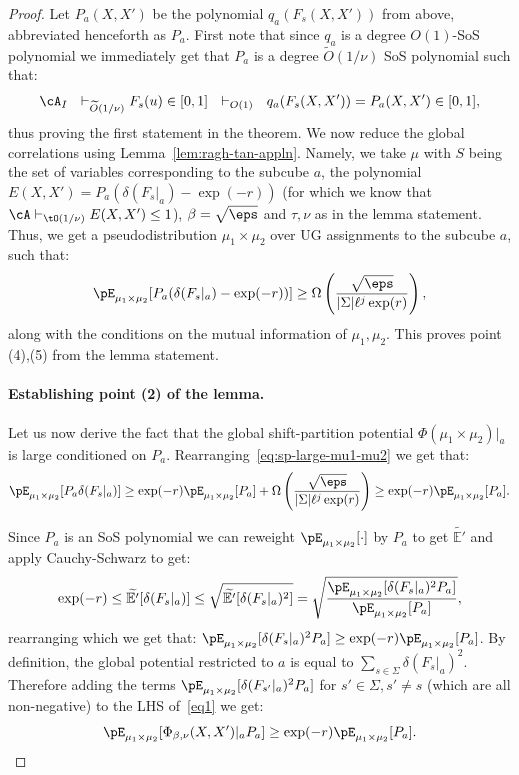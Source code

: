 \begin{proof}
Let $P_a(X,X')$ be the polynomial $q_a(F_s(X,X'))$ from above, abbreviated henceforth as $P_a$. First note that since $q_a$ is a degree $O(1)$-SoS polynomial we immediately get that $P_a$ is a degree $\widetilde{O}(1/\nu)$ SoS polynomial such that:
\[\cA_I ~~ \vdash_{\widetilde{O}(1/\nu)} F_s(u) \in [0,1] ~~\vdash_{O(1)} ~~ q_a(F_s(X,X')) = P_a(X,X') \in [0,1],\]
thus proving the first statement in the theorem.
We now reduce the global correlations using Lemma~\ref{lem:ragh-tan-appln}. 
Namely, we take $\mu$ with $S$ being the set of variables corresponding to the subcube $a$, the polynomial $E(X,X') = P_a(\delta(F_s|_a) - \exp(-r))$ (for which we know that $\cA \vdash_{\tO(1/\nu)} E(X,X') \leq 1$), $\beta = \sqrt{\eps}$ and $\tau,\nu$ as in the lemma statement. Thus, we get a 
pseudodistribution $\mu_1 \times \mu_2$ over UG assignments to the subcube $a$, such that: 
\begin{equation}\label{eq:sp-large-mu1-mu2}
\pE_{\mu_1 \times \mu_2}[P_a(\delta(F_s|_a) - \exp(-r))] \geq \Omega\left(\frac{\sqrt{\eps}}{|\Sigma|\ell^{j}\exp(r)}\right),
\end{equation}
 along with the conditions on the mutual information of $\mu_1,\mu_2$. 
This proves point (4),(5) from the lemma statement. 

\paragraph{Establishing point (2) of the lemma.}
Let us now derive the fact that the global shift-partition potential $\Phi(\mu_1 \times \mu_2)|_a$ is large conditioned on $P_a$.  
Rearranging~\eqref{eq:sp-large-mu1-mu2} we get that:
\begin{equation}\label{eq1}
    \pE_{\mu_1 \times \mu_2}[P_{a}\delta(F_s|_a)] \geq \exp(-r)\pE_{\mu_1 \times \mu_2}[P_a] + \Omega\left(\frac{\sqrt{\eps}}{|\Sigma|\ell^{j}\exp(r)}\right) \geq \exp(-r) \pE_{\mu_1 \times \mu_2}[P_a].
\end{equation}


Since $P_a$ is an SoS polynomial we can reweight $\pE_{\mu_1 \times \mu_2}[\cdot]$ by $P_a$ to get $\widetilde{\mathbb{E}'}$ and apply Cauchy-Schwarz to get:
\[\exp(-r) \leq \widetilde{\mathbb{E}'}[\delta(F_s|_a)] \leq \sqrt{\widetilde{\mathbb{E}'}[\delta(F_s|_a)^2]} = 
\sqrt{\frac{\pE_{\mu_1 \times \mu_2}[\delta(F_s|_a)^2 P_a]}{\pE_{\mu_1 \times \mu_2}[P_a]}},\]
rearranging which we get that: $\pE_{\mu_1 \times \mu_2}[\delta(F_s|_a)^2P_a] \geq \exp(-r)\pE_{\mu_1 \times \mu_2}[P_a]$. By definition, the global potential restricted to $a$ is equal to $\sum_{s \in \Sigma} \delta(F_s|_a)^2$. Therefore adding the terms $\pE_{\mu_1 \times \mu_2}[\delta(F_{s'}|_a)^2 P_a]$ for $s' \in \Sigma, s' \neq s$ (which are all non-negative) to the LHS of~\eqref{eq1} we get:
\begin{equation}\label{eq:global-large}
\pE_{\mu_1 \times \mu_2}[\Phi_{\beta,\nu}(X,X')|_a P_a] \geq \exp(-r)\pE_{\mu_1 \times \mu_2}[P_a].
\end{equation}


\end{proof}
